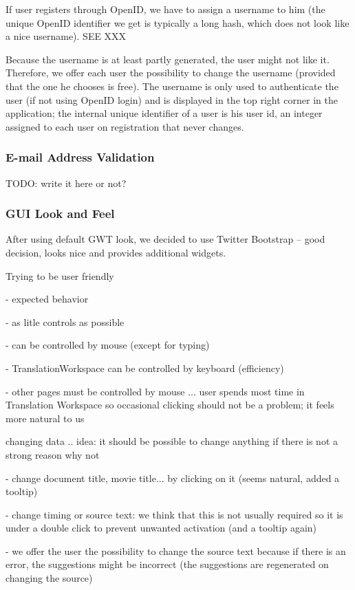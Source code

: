 If user registers through OpenID, we have to assign a username to him (the unique OpenID identifier we get is typically a long hash, which does not look like a nice username). SEE XXX

Because the username is at least partly generated, the user might not like it. Therefore, we offer each user the possibility to change the username (provided that the one he chooses is free). The username is only used to authenticate the user (if not using OpenID login) and is displayed in the top right corner in the application; the internal unique identifier of a user is his user id, an integer assigned to each user on registration that never changes.

\subsubsection{E-mail Address Validation}

TODO: write it here or not?

\subsubsection{GUI Look and Feel}

After using default GWT look, we decided to use Twitter Bootstrap -- good decision, looks nice and provides additional widgets.

Trying to be user friendly

- expected behavior

- as litle controls as possible

- can be controlled by mouse (except for typing)

- TranslationWorkspace can be controlled by keyboard (efficiency)

- other pages must be controlled by mouse ... user spends most time in Translation Workspace so occasional clicking should not be a problem; it feels more natural to us

changing data .. idea: it should be possible to change anything if there is not a strong reason why not

- change document title, movie title... by clicking on it (seems natural, added a tooltip)

- change timing or source text: we think that this is not usually required so it is under a double click to prevent unwanted activation (and a tooltip again)

- we offer the user the possibility to change the source text because if there is an error, the suggestions might be incorrect (the suggestions are regenerated on changing the source)

